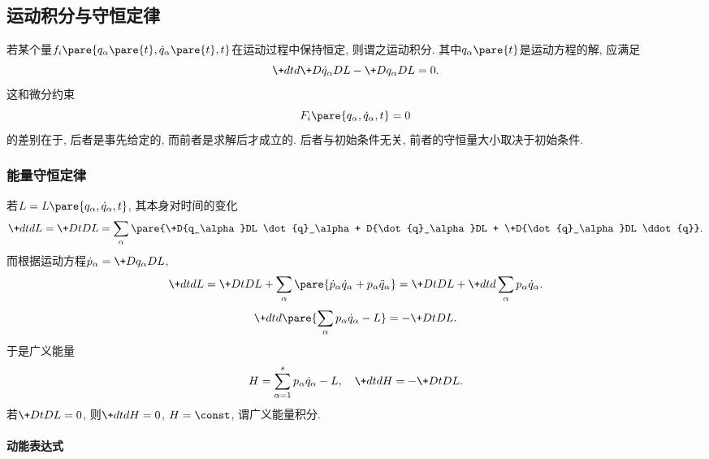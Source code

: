 \documentclass[../LectureNotes.tex]{subfiles}
\begin{document}

\subsection{运动积分与守恒定律} %
\label{sub:运动积分与守恒定律}

若某个量$f_i\pare{q_\alpha\pare{t},\dot{q}_\alpha\pare{t},t}$在运动过程中保持恒定, 则谓之运动积分. 其中$q_\alpha\pare{t}$是运动方程的解, 应满足
\[ \+dtd{}\+D{\dot{q}_\alpha}DL - \+D{q_\alpha}DL = 0. \]
这和微分约束
\[ F_i\pare{q_\alpha,\dot{q}_\alpha,t} = 0 \]
的差别在于, 后者是事先给定的, 而前者是求解后才成立的. 后者与初始条件无关, 前者的守恒量大小取决于初始条件.

\subsubsection{能量守恒定律} %
\label{ssub:能量守恒定律}

若$L = L\pare{q_\alpha,\dot{q}_\alpha,t}$, 其本身对时间的变化
\[ \+dtdL = \+DtDL = \sum_\alpha\pare{\+D{q_\alpha}DL \dot{q}_\alpha + D{\dot{q}_\alpha}DL + \+D{\dot{q}_\alpha}DL \ddot{q}}. \]
而根据运动方程$\dot{p}_\alpha = \displaystyle \+D{q_\alpha}DL$,
\[ \+dtdL = \+DtDL + \sum_{\alpha} \pare{\dot{p}_\alpha \dot{q}_\alpha + p_\alpha \ddot{q}_\alpha} = \+DtDL + \+dtd{}\sum_\alpha p_\alpha \dot{q}_\alpha. \]
\[ \+dtd{}\pare{\sum_\alpha p_\alpha\dot{q}_\alpha - L} = -\+DtDL. \]
于是广义能量
\[ H = \sum_{\alpha = 1}^s p_\alpha\dot{q}_\alpha  - L, \quad \+dtdH = -\+DtDL. \]
若$\displaystyle \+DtDL = 0$, 则$\displaystyle \+dtdH = 0$, $H=\const$, 谓广义能量积分.

\paragraph{动能表达式} %
\label{par:动能表达式}
\end{document}
